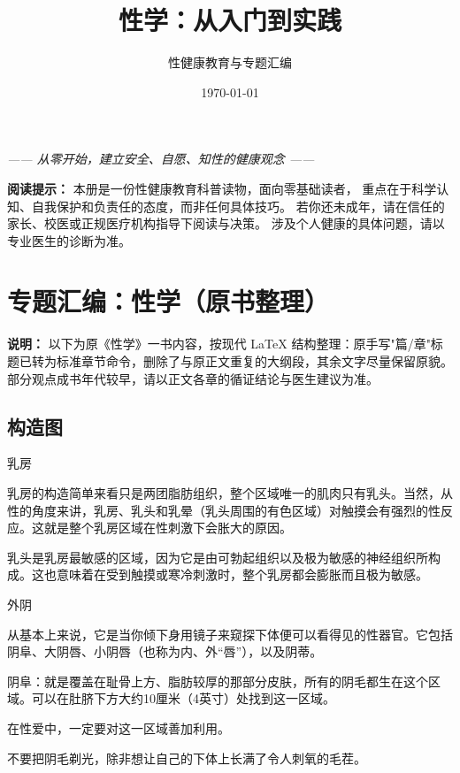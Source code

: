 \documentclass[12pt,UTF8,openany]{ctexbook}
\title{\myhei\zihao{0} 性学：从入门到实践}
\author{性健康教育与专题汇编}
\date{\today}
\begin{document}
\maketitle

\begin{center}
\itshape{}
—— 从零开始，建立安全、自愿、知性的健康观念 ——
\end{center}

\vspace{1em}

\noindent\textbf{阅读提示：} 本册是一份性健康教育科普读物，面向零基础读者，
重点在于科学认知、自我保护和负责任的态度，而非任何具体技巧。
若你还未成年，请在信任的家长、校医或正规医疗机构指导下阅读与决策。
涉及个人健康的具体问题，请以专业医生的诊断为准。

\tableofcontents




\clearpage
\part{专题汇编：性学（原书整理）}

\noindent\textbf{说明：} 以下为原《性学》一书内容，按现代 LaTeX 结构整理：原手写"篇/章"标题已转为标准章节命令，删除了与原正文重复的大纲段，其余文字尽量保留原貌。部分观点成书年代较早，请以正文各章的循证结论与医生建议为准。

\chapter{构造图}

乳房

乳房的构造简单来看只是两团脂肪组织，整个区域唯一的肌肉只有乳头。当然，从性的角度来讲，乳房、乳头和乳晕（乳头周围的有色区域）对触摸会有强烈的性反应。这就是整个乳房区域在性刺激下会胀大的原因。

乳头是乳房最敏感的区域，因为它是由可勃起组织以及极为敏感的神经组织所构成。这也意味着在受到触摸或寒冷刺激时，整个乳房都会膨胀而且极为敏感。

外阴

从基本上来说，它是当你倾下身用镜子来窥探下体便可以看得见的性器官。它包括阴阜、大阴唇、小阴唇（也称为内、外“唇”），以及阴蒂。

阴阜：就是覆盖在耻骨上方、脂肪较厚的那部分皮肤，所有的阴毛都生在这个区域。可以在肚脐下方大约10厘米（4英寸）处找到这一区域。

在性爱中，一定要对这一区域善加利用。

不要把阴毛剃光，除非想让自己的下体上长满了令人刺氧的毛茬。
\end{document}
